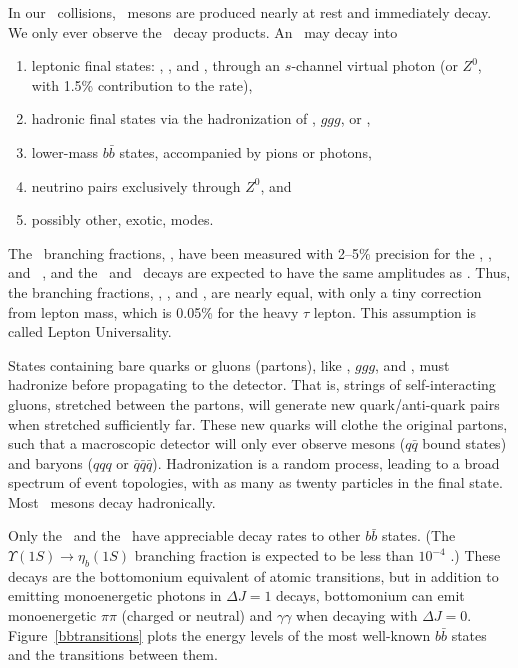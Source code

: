 \documentclass{cornell}
\begin{document}
In our \ee\ collisions, \ups\ mesons are produced nearly at rest and
immediately decay.  We only ever observe the \ups\ decay products.  An
\ups\ may decay into
\renewcommand{\labelenumi}{\alph{enumi}.}
\begin{enumerate}

  \item leptonic final states: \ee, \mumu, and \tautau, through an
    $s$-channel virtual photon (or $Z^0$, with 1.5\% contribution to
    the rate),

  \item hadronic final states via the hadronization of \qqbar, $ggg$,
    or \gggamma,

  \item lower-mass $b\bar{b}$ states, accompanied by pions or photons,

  \item neutrino pairs exclusively through $Z^0$, and

  \item possibly other, exotic, modes.

\end{enumerate}

The \mumu\ branching fractions, \bmm, have been measured with 2--5\%
precision for the \us, \uss, and \usss\ \cite{istvan}, and the \ee\
and \tautau\ decays are expected to have the same amplitudes as \mumu.
Thus, the branching fractions, \bee, \bmm, and \btt, are nearly equal,
with only a tiny correction from lepton mass, which is 0.05\% for the
heavy $\tau$ lepton.  This assumption is called Lepton Universality.

States containing bare quarks or gluons (partons), like \qqbar, $ggg$,
and \gggamma, must hadronize before propagating to the detector.  That
is, strings of self-interacting gluons, stretched between the partons,
will generate new quark/anti-quark pairs when stretched sufficiently
far.  These new quarks will clothe the original partons, such that a
macroscopic detector will only ever observe mesons ($q\bar{q}$ bound
states) and baryons ($qqq$ or $\bar{q}\bar{q}\bar{q}$).  Hadronization
is a random process, leading to a broad spectrum of event topologies,
with as many as twenty particles in the final state.  Most \ups\
mesons decay hadronically.

Only the \uss\ and the \usss\ have appreciable decay rates to other
$b\bar{b}$ states.  (The $\Upsilon(1S) \to \eta_b(1S)$ branching
fraction is expected to be less than $10^{-4}$ \cite{ustoetab}.)
These decays are the bottomonium equivalent of atomic transitions, but
in addition to emitting monoenergetic photons in $\Delta J = 1$
decays, bottomonium can emit monoenergetic $\pi\pi$ (charged or
neutral) and $\gamma\gamma$ when decaying with $\Delta J = 0$.
Figure~\ref{bbtransitions} plots the energy levels of the most
well-known $b\bar{b}$ states and the transitions between them.
\end{document}
